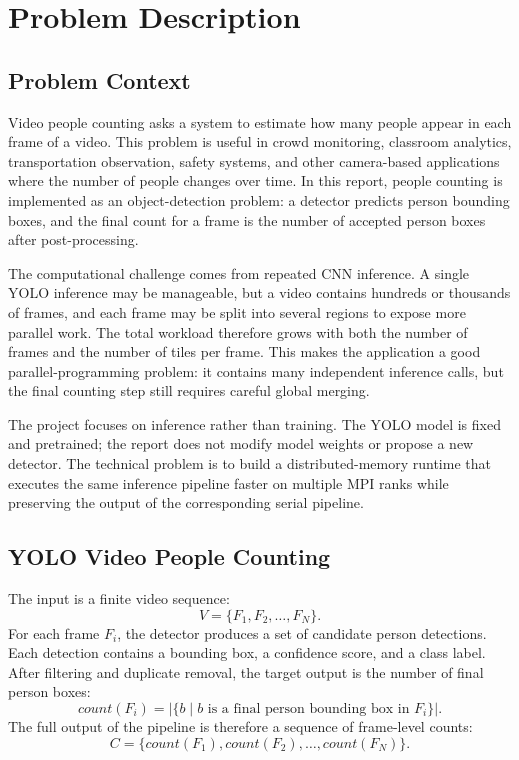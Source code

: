 \chapter{Problem Description}

\section{Problem Context}
Video people counting asks a system to estimate how many people appear in each frame of a video. This problem is useful in crowd monitoring, classroom analytics, transportation observation, safety systems, and other camera-based applications where the number of people changes over time. In this report, people counting is implemented as an object-detection problem: a detector predicts person bounding boxes, and the final count for a frame is the number of accepted person boxes after post-processing.

The computational challenge comes from repeated CNN inference. A single YOLO inference may be manageable, but a video contains hundreds or thousands of frames, and each frame may be split into several regions to expose more parallel work. The total workload therefore grows with both the number of frames and the number of tiles per frame. This makes the application a good parallel-programming problem: it contains many independent inference calls, but the final counting step still requires careful global merging.

The project focuses on inference rather than training. The YOLO model is fixed and pretrained; the report does not modify model weights or propose a new detector. The technical problem is to build a distributed-memory runtime that executes the same inference pipeline faster on multiple MPI ranks while preserving the output of the corresponding serial pipeline.

\section{YOLO Video People Counting}
The input is a finite video sequence:
\begin{equation}
    V = \{F_1, F_2, \ldots, F_N\}.
\end{equation}
For each frame \(F_i\), the detector produces a set of candidate person detections. Each detection contains a bounding box, a confidence score, and a class label. After filtering and duplicate removal, the target output is the number of final person boxes:
\begin{equation}
    count(F_i) = |\{b \mid b \text{ is a final person bounding box in } F_i\}|.
\end{equation}
The full output of the pipeline is therefore a sequence of frame-level counts:
\begin{equation}
    C = \{count(F_1), count(F_2), \ldots, count(F_N)\}.
\end{equation}

